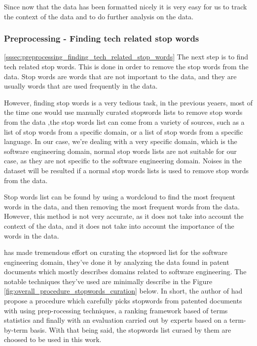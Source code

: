 Since now that the data has been formatted nicely it is very easy for us to track the context of the data and to do further analysis on the data.

\subsubsection{Preprocessing - Finding tech related stop words} \ref{sssec:preprocessing_finding_tech_related_stop_words} \label{sssec:preprocessing_finding_tech_related_stop_words}
The next step is to find tech related stop words. This is done in order to remove the stop words from the data. Stop words are words that are not important to the data, and they are usually words that are used frequently in the data. 

However, finding stop words is a very tedious task, in the previous yeaers, most of the time one would use manually curated stopwords lists to remove stop words from the data \cite{stopwords_1},the stop words list can come from a variety of sources, such as a list of stop words from a specific domain, or a list of stop words from a specific language. In our case, we're dealing with a very specific domain, which is the software engineering domain, normal stop words lists are not suitable for our case, as they are not specific to the software engineering domain. Noises in the dataset will be resulted if a normal stop words lists is used to remove stop words from the data.

Stop words list can be found by using a wordcloud to find the most frequent words in the data, and then removing the most frequent words from the data. However, this method is not very accurate, as it does not take into account the context of the data, and it does not take into account the importance of the words in the data. 

\cite{stopwords_2} has made tremendous effort on curating the stopword list for the software engineering domain, they've done it by analyzing the data found in patent documents which mostly describes domains related to software engineering. The notable techniques they've used are minimally describe in the Figure \ref{fig:overall_procedure_stopwords_curation} below. In short, the author of \cite{stopwords_2} had propose a procedure which carefully picks stopwords from patented documents with using prep-rocessing techniques, a ranking framework based of terms statistics and finally with an evaluation carried out by experts based on a term-by-term basis. With that being said, the stopwords list curaed by them are choosed to be used in this work.

